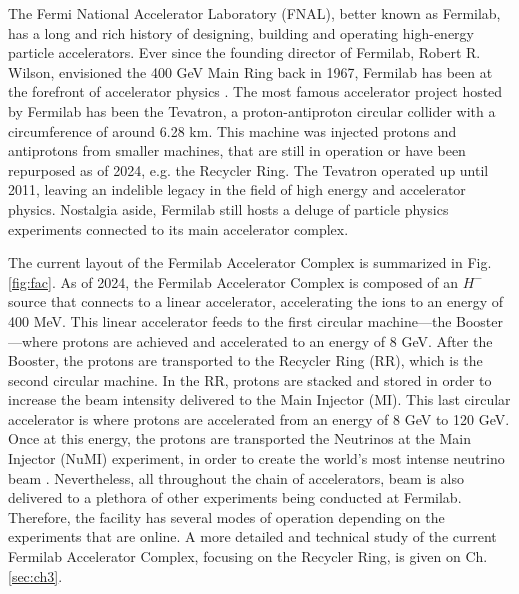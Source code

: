 The Fermi National Accelerator Laboratory (FNAL), better known as Fermilab, has a long and rich history of designing, building and operating high-energy particle accelerators. Ever since the founding director of Fermilab, Robert R. Wilson, envisioned the 400 GeV Main Ring back in 1967, Fermilab has been at the forefront of accelerator physics \cite{fermilab1,fermi50,tevatron}. The most famous accelerator project hosted by Fermilab has been the Tevatron, a proton-antiproton circular collider with a circumference of around 6.28 km. This machine was injected protons and antiprotons from smaller machines, that are still in operation or have been repurposed as of 2024, e.g. the Recycler Ring. The Tevatron operated up until 2011, leaving an indelible legacy in the field of high energy and accelerator physics. Nostalgia aside, Fermilab still hosts a deluge of particle physics experiments connected to its main accelerator complex.      

The current layout of the Fermilab Accelerator Complex is summarized in Fig. \ref{fig:fac}. As of 2024, the Fermilab Accelerator Complex is composed of an $H^-$ source that connects to a linear accelerator, accelerating the ions to an energy of 400 MeV. This linear accelerator feeds to the first circular machine---the Booster---where protons are achieved and accelerated to an energy of 8 GeV. After the Booster, the protons are transported to the Recycler Ring (RR), which is the second circular machine. In the RR, protons are stacked and stored in order to increase the beam intensity delivered to the Main Injector (MI). This last circular accelerator is where protons are accelerated from an energy of 8 GeV to 120 GeV. Once at this energy, the protons are transported the Neutrinos at the Main Injector (NuMI) experiment, in order to create the world's most intense neutrino beam \cite{numi1}. Nevertheless, all throughout the chain of accelerators, beam is also delivered to a plethora of other experiments being conducted at Fermilab. Therefore, the facility has several modes of operation depending on the experiments that are online. A more detailed and technical study of the current Fermilab Accelerator Complex, focusing on the Recycler Ring, is given on Ch. \ref{sec:ch3}.   


